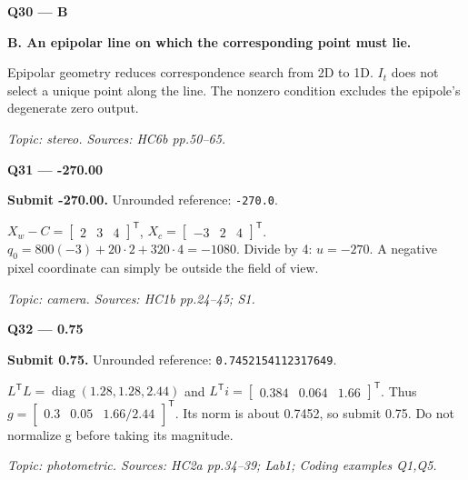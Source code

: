 \documentclass[11pt,a4paper]{article}
\begin{document}
\par\vspace{12pt}
\begin{minipage}{\linewidth}
\textbf{Q30 — B}\par\smallskip
\textbf{B. An epipolar line on which the corresponding point must lie.}\par
Epipolar geometry reduces correspondence search from 2D to 1D. \(I_t\) does not select a unique point along the line. The nonzero condition excludes the epipole's degenerate zero output.\par
{\small\itshape Topic: stereo. Sources: HC6b pp.50–65.}

\end{minipage}
\par\vspace{12pt}
\begin{minipage}{\linewidth}
\textbf{Q31 — -270.00}\par\smallskip
\textbf{Submit -270.00.} Unrounded reference: \texttt{-270.0}.\par
\(X_w-C=\begin{bmatrix}2&3&4\end{bmatrix}^{\mathsf T}\),\allowbreak{} \(X_c=\begin{bmatrix}-3&2&4\end{bmatrix}^{\mathsf T}\). \(q_0=800(-3)+20\cdot2+320\cdot4=-1080\). Divide by 4: \(u=-270\). A negative pixel coordinate can simply be outside the field of view.\par
{\small\itshape Topic: camera. Sources: HC1b pp.24–45; S1.}

\end{minipage}
\par\vspace{12pt}
\begin{minipage}{\linewidth}
\textbf{Q32 — 0.75}\par\smallskip
\textbf{Submit 0.75.} Unrounded reference: \texttt{0.7452154112317649}.\par
\(L^{\mathsf T}L=\operatorname{diag}(1.28,1.28,2.44)\) and \(L^{\mathsf T}i=\begin{bmatrix}0.384&0.064&1.66\end{bmatrix}^{\mathsf T}\). Thus \(g=\begin{bmatrix}0.3&0.05&1.66/2.44\end{bmatrix}^{\mathsf T}\). Its norm is about 0.7452,\allowbreak{} so submit 0.75. Do not normalize g before taking its magnitude.\par
{\small\itshape Topic: photometric. Sources: HC2a pp.34–39; Lab1; Coding examples Q1,\allowbreak{}Q5.}

\end{minipage}
\end{document}
